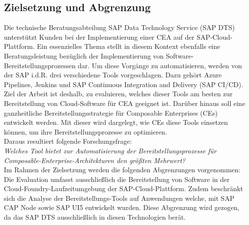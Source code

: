 \subsection{Zielsetzung und Abgrenzung}
Die technische Beratungsabteilung SAP Data Technology Service (\acs{SAP DTS}) unterstützt Kunden bei der Implementierung einer CEA auf der SAP-Cloud-Plattform. 
Ein essenzielles Thema stellt in diesem Kontext ebenfalls eine Beratungsleistung bezüglich der Implementierung von Software-Bereitstellungsprozessen dar. Um diese Vorgänge zu automatisieren, werden von der SAP i.d.R. drei verschiedene Tools vorgeschlagen. Dazu gehört Azure Pipelines, Jenkins und SAP Continuous Integration and Delivery (\acs{SAP CI/CD}). Ziel der Arbeit ist deshalb, zu evaluieren, welches dieser Tools am besten zur Bereitstellung von Cloud-Software für CEA geeignet ist. Darüber hinaus soll eine ganzheitliche Bereitstellungsstrategie für Composable Enterprises (\acs{CE}s) entwickelt werden. Mit dieser wird dargelegt, wie CEs diese Tools einsetzen können, um ihre Bereitstellungsprozesse zu optimieren.\\ Daraus resultiert folgende Forschungsfrage:\\
\textit{Welches Tool bietet zur Automatisierung der Bereitstellungsprozesse für Composable-\-Enterprise-Architekturen den größten Mehrwert?}\\
Im Rahmen der Zielsetzung werden die folgenden Abgrenzungen vorgenommen: Die Evaluation umfasst ausschließlich die Bereitstellung von Software in der Cloud-Foundry-Laufzeitumgebung der SAP-Cloud-Plattform. Zudem beschränkt sich die Analyse der Bereitstellungs-Tools auf Anwendungen welche, mit SAP CAP Node sowie SAP UI5 entwickelt wurden. Diese Abgrenzung wird gezogen, da das SAP DTS ausschließlich in diesen Technologien berät.  

